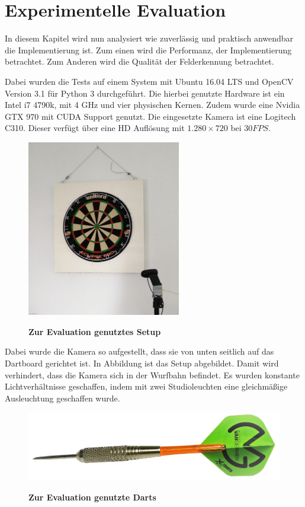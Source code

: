 
\chapter{Experimentelle Evaluation}
\label{chap:evaluation}
In diesem Kapitel wird nun analysiert wie zuverlässig und praktisch anwendbar die Implementierung ist. Zum einen wird die Performanz, der Implementierung betrachtet.  Zum Anderen wird die Qualität der Felderkennung betrachtet. 

Dabei wurden die Tests auf einem System mit Ubuntu 16.04 LTS und OpenCV Version 3.1 für Python 3 durchgeführt. Die hierbei genutzte Hardware ist ein Intel i7 4790k, mit 4 GHz und vier physischen Kernen. Zudem wurde eine Nvidia GTX 970 mit CUDA Support genutzt.
Die eingesetzte Kamera ist eine Logitech C310. Dieser verfügt über eine HD Auflösung mit  $1.280\times720$ bei $30FPS$. 

\begin{figure}[ht]
\centering
\includegraphics[width=0.6\textwidth]{media/testsetup}\\
\caption{\textbf{Zur Evaluation genutztes Setup}}
\label{Fig:testsetup}
\end{figure}
Dabei wurde die Kamera so aufgestellt, dass sie von unten seitlich auf das Dartboard gerichtet ist. In Abbildung  ist das Setup abgebildet. Damit wird verhindert, dass die Kamera sich in der Wurfbahn befindet. Es wurden konstante Lichtverhältnisse geschaffen, indem mit zwei Studioleuchten eine gleichmäßige Ausleuchtung geschaffen wurde.
\begin{figure}[ht]
\centering
\includegraphics[width=\textwidth]{media/MyDart.png}\\
\caption{\textbf{Zur Evaluation genutzte Darts}}
\label{Fig:mydart}
\end{figure}

